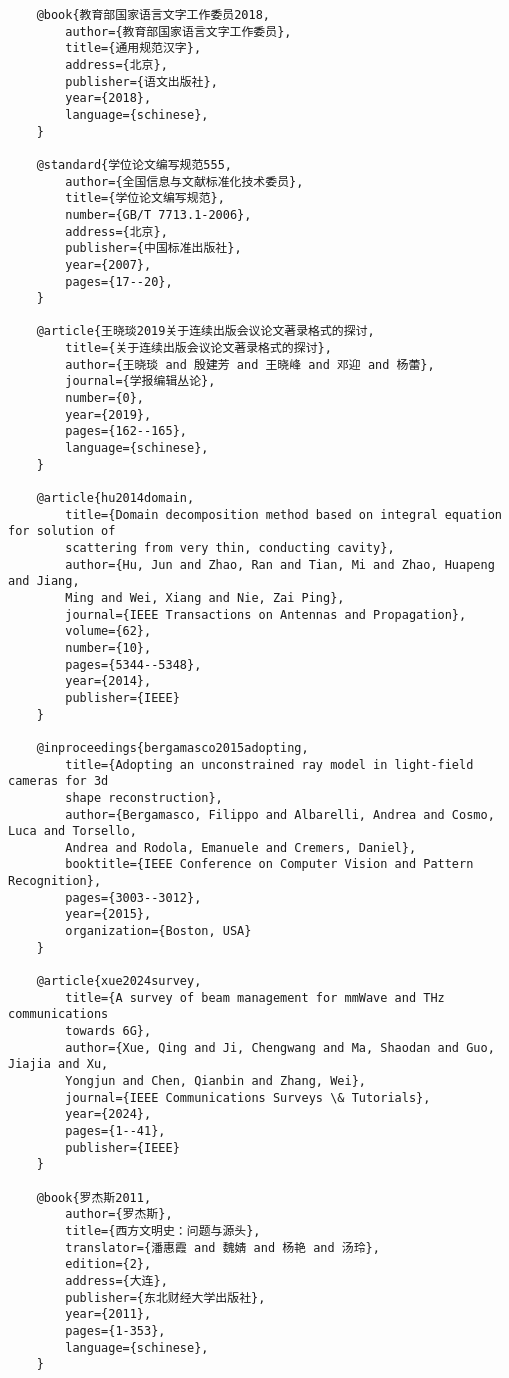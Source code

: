 \documentclass[print, doctor, vlined]{DissertUESTC}
\begin{document}
	\begin{verbatim}
	@book{教育部国家语言文字工作委员2018,
	    author={教育部国家语言文字工作委员},
	    title={通用规范汉字},
	    address={北京},
	    publisher={语文出版社},
	    year={2018},
	    language={schinese},
	}
	
	@standard{学位论文编写规范555,
	    author={全国信息与文献标准化技术委员},
	    title={学位论文编写规范},
	    number={GB/T 7713.1-2006},
	    address={北京},
	    publisher={中国标准出版社},
	    year={2007},
	    pages={17--20},
	}
	
	@article{王晓琰2019关于连续出版会议论文著录格式的探讨,
	    title={关于连续出版会议论文著录格式的探讨},
	    author={王晓琰 and 殷建芳 and 王晓峰 and 邓迎 and 杨蕾},
	    journal={学报编辑丛论},
	    number={0},
	    year={2019},
	    pages={162--165},
	    language={schinese},
	}
	
	@article{hu2014domain,
	    title={Domain decomposition method based on integral equation for solution of
	    scattering from very thin, conducting cavity},
	    author={Hu, Jun and Zhao, Ran and Tian, Mi and Zhao, Huapeng and Jiang,
	    Ming and Wei, Xiang and Nie, Zai Ping},
	    journal={IEEE Transactions on Antennas and Propagation},
	    volume={62},
	    number={10},
	    pages={5344--5348},
	    year={2014},
	    publisher={IEEE}
	}
	
	@inproceedings{bergamasco2015adopting,
	    title={Adopting an unconstrained ray model in light-field cameras for 3d
	    shape reconstruction},
	    author={Bergamasco, Filippo and Albarelli, Andrea and Cosmo, Luca and Torsello,
	    Andrea and Rodola, Emanuele and Cremers, Daniel},
	    booktitle={IEEE Conference on Computer Vision and Pattern Recognition},
	    pages={3003--3012},
	    year={2015},
	    organization={Boston, USA}
	}
	
	@article{xue2024survey,
	    title={A survey of beam management for mmWave and THz communications
	    towards 6G},
	    author={Xue, Qing and Ji, Chengwang and Ma, Shaodan and Guo, Jiajia and Xu,
	    Yongjun and Chen, Qianbin and Zhang, Wei},
	    journal={IEEE Communications Surveys \& Tutorials},
	    year={2024},
	    pages={1--41},
	    publisher={IEEE}
	}
	
	@book{罗杰斯2011,
	    author={罗杰斯},
	    title={西方文明史：问题与源头},
	    translator={潘惠霞 and 魏婧 and 杨艳 and 汤玲},
	    edition={2},
	    address={大连},
	    publisher={东北财经大学出版社},
	    year={2011},
	    pages={1-353},
	    language={schinese},
	}
	

\end{verbatim}
\end{document}
